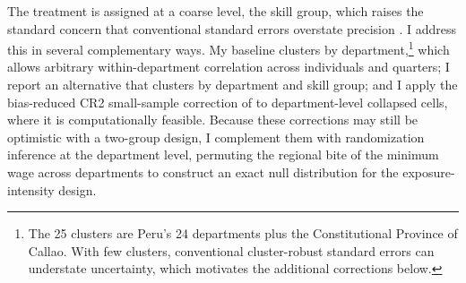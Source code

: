 The treatment is assigned at a coarse level, the skill group, which raises the standard concern that conventional standard errors overstate precision \citep{bertrand_2004}. I address this in several complementary ways. My baseline clusters by department,\footnote{The 25 clusters are Peru's 24 departments plus the Constitutional Province of Callao. With few clusters, conventional cluster-robust standard errors can understate uncertainty, which motivates the additional corrections below.} which allows arbitrary within-department correlation across individuals and quarters; I report an alternative that clusters by department and skill group; and I apply the bias-reduced CR2 small-sample correction of \citet{pustejovsky_tipton_2018} to department-level collapsed cells, where it is computationally feasible. Because these corrections may still be optimistic with a two-group design, I complement them with randomization inference at the department level, permuting the regional bite of the minimum wage across departments to construct an exact null distribution for the exposure-intensity design.
